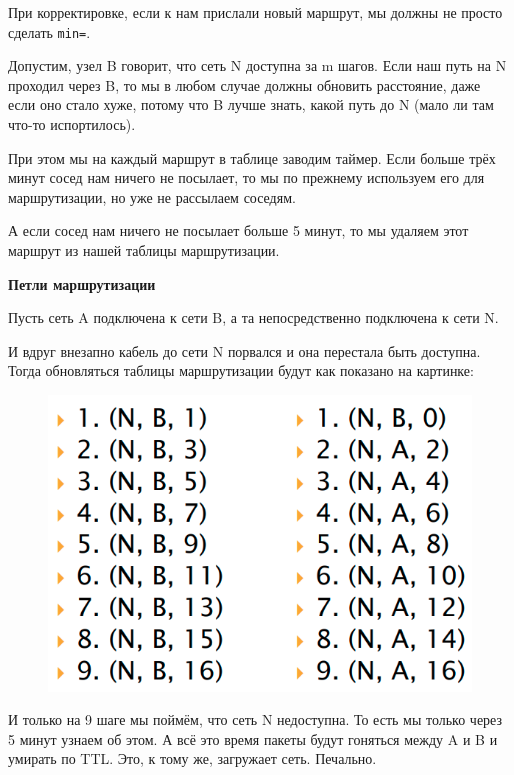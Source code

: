 При корректировке, если к нам прислали новый маршрут, мы должны не просто сделать {\tt min=}.

Допустим, узел B говорит, что сеть N доступна за m шагов. Если наш путь на N проходил через B, то мы в любом случае должны обновить расстояние, даже если оно стало хуже, потому что B лучше знать, какой путь до N (мало ли там что-то испортилось).

При этом мы на каждый маршрут в таблице заводим таймер. Если больше трёх минут сосед нам ничего не посылает, то мы по прежнему используем его для маршрутизации, но уже не рассылаем соседям.

А если сосед нам ничего не посылает больше 5 минут, то мы удаляем этот маршрут из нашей таблицы маршрутизации.

{\bf Петли маршрутизации}

Пусть сеть A подключена к сети B, а та непосредственно подключена к сети N.

И вдруг внезапно кабель до сети N порвался и она перестала быть доступна. Тогда обновляться таблицы маршрутизации будут как показано на картинке:

\begin{figure}[H]
  \centering
  \includegraphics[width=15cm]{images/04/06}
\end{figure}

И только на 9 шаге мы поймём, что сеть N недоступна. То есть мы только через 5 минут узнаем об этом. А всё это время пакеты будут гоняться между A и B и умирать по TTL. Это, к тому же, загружает сеть. Печально.

